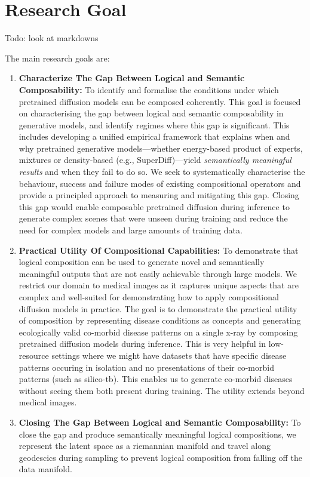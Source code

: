 \section{Research Goal}
\label{sec:research_objectives_research_goal}
Todo: look at markdowns

The main research goals are:

\begin{enumerate}
    \item \textbf{Characterize The Gap Between Logical and Semantic Composability:}
    To identify and formalise the conditions under which
    pretrained diffusion models can be composed coherently. This goal is focused on characterising the gap between logical and semantic composability in generative models, and identify regimes where this gap is significant.
    This includes developing a unified empirical framework that explains
    when and why pretrained generative models---whether energy-based product of experts, mixtures or density-based (e.g., SuperDiff)---yield
    \emph{semantically meaningful results} and when they fail to do so.
    We seek to systematically characterise the behaviour, success and failure modes of existing compositional operators and
    provide a principled approach to measuring and mitigating this gap.
    Closing this gap would enable composable pretrained diffusion during inference to generate complex scenes that were unseen during training and
    reduce the need for complex models and large amounts of training data.
    \item \textbf{Practical Utility Of Compositional Capabilities:}
    To demonstrate that logical composition can be used to generate novel and semantically meaningful outputs that are not easily achievable through large models.
    We restrict our domain to medical images as it captures unique aspects that are complex and well-suited for demonstrating how to apply compositional diffusion models in practice.
    The goal is to demonstrate the practical utility of composition by representing disease conditions as concepts and generating ecologically valid co-morbid disease patterns on a single x-ray by composing pretrained diffusion models during inference.
    This is very helpful in low-resource settings where we might have datasets that have specific disease patterns occuring in isolation and no presentations of their co-morbid patterns (such as silico-tb). This enables us to
    generate co-morbid diseases without seeing them both present during training. The utility extends beyond medical images.
    \item \textbf{Closing The Gap Between Logical and Semantic Composability:}
    To close the gap and produce semantically meaningful logical compositions, we represent the latent space as a riemannian manifold and
    travel along geodescics during sampling to prevent logical composition from falling off the data manifold.
\end{enumerate}
